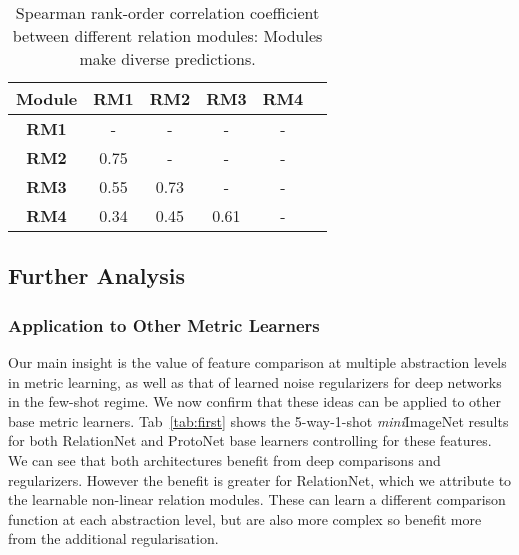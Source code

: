 \documentclass[conference]{IEEEtran}
\def\miniIN{\textit{mini}ImageNet}
\begin{document}
\setlength{\tabcolsep}{4.8pt}
\begin{table}[tb]
\centering
\footnotesize
\begin{tabular}{@{} cccccc @{}}
\hline
{\bf Module} & {\bf RM1} & {\bf RM2} & {\bf RM3} & {\bf RM4} \\
\midrule
\textbf{RM1} & - & - & - & - \\
\textbf{RM2} & 0.75 & - & - & - \\
\textbf{RM3} & 0.55 & 0.73 & - & - \\
\textbf{RM4} & 0.34 & 0.45 & 0.61 & - \\
\bottomrule
\end{tabular}
\caption{\small Spearman rank-order correlation coefficient between different relation modules: Modules make diverse predictions.}
\label{tab:score-corelation}
\end{table}



\subsection{Further Analysis}\label{sec:further}

\subsubsection{Application to Other Metric Learners} Our main insight is the value of feature comparison at multiple abstraction levels in metric learning, as well as that of learned noise regularizers for deep networks in the few-shot regime. We now confirm that these ideas can be applied to other base metric learners. Tab~\ref{tab:first} shows the 5-way-1-shot \miniIN{} results for both RelationNet \cite{yang2018learning} and ProtoNet \cite{snell2017prototypical} base learners controlling for these features. We can see that both architectures benefit from deep comparisons and regularizers. However the benefit is greater for RelationNet, which we attribute to the learnable non-linear  relation modules. These can learn a different comparison function at each abstraction level, but are also more complex so benefit more from the additional regularisation.
\end{document}
